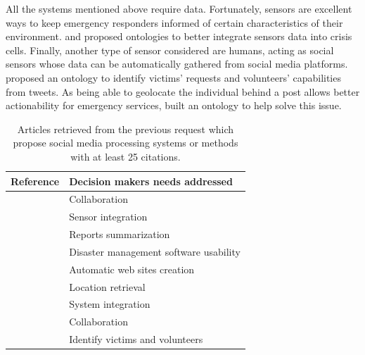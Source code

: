 All the systems mentioned above require data.
Fortunately, sensors are excellent ways to keep emergency responders informed of certain characteristics of their environment.
\cite{posladSemanticIoTEarly2015} and \cite{babitskiOntologybasedIntegrationSensor2009} proposed ontologies to better integrate sensors data into crisis cells.
Finally, another type of sensor considered are humans, acting as social sensors whose data can be automatically gathered from social media platforms.
\cite{purohitIdentifyingSeekersSuppliers2014} proposed an ontology to identify victims' requests and volunteers' capabilities from tweets.
As being able to geolocate the individual behind a post allows better actionability for emergency services, \cite{ghahremanlouGeotaggingTwitterMessages2014} built an ontology to help solve this issue.

\begin{table}[bp]
    \centering
    \renewcommand{\arraystretch}{1.5}
    \caption{Articles retrieved from the previous request which propose social media processing systems or methods with at least 25 citations.}
    \begin{tabular}{m{} m{}}
        Reference                                               & Decision makers needs addressed        \\ [0.5ex]
        \toprule
        \cite{benabenMetamodelItsOntology2008b}                 & Collaboration                          \\
        \cite{babitskiOntologybasedIntegrationSensor2009}       & Sensor integration                     \\
        \cite{liOntologyenrichedMultiDocumentSummarization2010} & Reports summarization                  \\
        \cite{babitskiSoKNOSUsingSemantic2011}                  & Disaster management software usability \\
        \cite{chouOntologyDevelopingWeb2011}                    & Automatic web sites creation           \\
        \cite{ghahremanlouGeotaggingTwitterMessages2014}        & Location retrieval                     \\
        \cite{madniSystemsIntegrationKey2014}                   & System integration                     \\
        \cite{othmanDevelopmentValidationDisaster2014b}         & Collaboration                          \\
        \cite{purohitIdentifyingSeekersSuppliers2014}           & Identify victims and volunteers        \\

\end{tabular}
\end{table}
